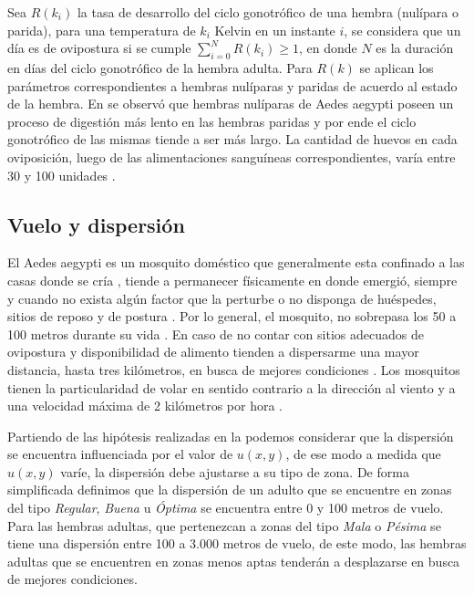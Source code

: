 Sea $R(k_{i})$ la tasa de desarrollo del ciclo gonotrófico de una hembra (nulípara o parida), para
una temperatura de $k_{i}$ Kelvin en un instante $i$, se considera que un día es de ovipostura si
se cumple $\sum_{i=0}^{N} R(k_{i}) \geq 1$, en donde $N$ es la duración en días del ciclo
gonotrófico de la hembra adulta. Para $R(k)$ se aplican los parámetros correspondientes a hembras
nulíparas y paridas de acuerdo al estado de la hembra. En \cite{edman1987host} se observó que
hembras nulíparas de Aedes aegypti poseen un proceso de digestión más lento en las hembras paridas
y por ende el ciclo gonotrófico de las mismas tiende a ser más largo. La cantidad de huevos en
cada oviposición, luego de las alimentaciones sanguíneas correspondientes, varía entre 30 y 100
unidades \cite{luevano1993ciclo, beltran2001bionomia,cabezas2005dengue}.

\subsection{Vuelo y dispersión}
El Aedes aegypti es un mosquito doméstico que generalmente esta confinado a las casas donde se
cría \cite{luevano1993ciclo}, tiende a permanecer físicamente en donde emergió, siempre y cuando
no exista algún factor que la perturbe o no disponga de huéspedes, sitios de reposo y de postura
\cite{ThironIzcazaJ2003}. Por lo general, el mosquito, no sobrepasa los 50 a 100 metros durante su
vida \cite{cabezas2005dengue}. En caso de no contar con sitios adecuados de ovipostura y
disponibilidad de alimento tienden a dispersarme una mayor distancia, hasta tres kilómetros, en
busca de mejores condiciones \cite{ThironIzcazaJ2003}. Los mosquitos tienen la particularidad de
volar en sentido contrario a la dirección al viento \cite{ThironIzcazaJ2003,web-site:speedAnimals}
y a una velocidad máxima de 2 kilómetros por hora \cite{web-site:speedAnimals,kaufmann2004flight}.

Partiendo de las hipótesis realizadas en la podemos considerar que la dispersión se encuentra
influenciada por el valor de $u(x,y)$, de ese modo a medida que $u(x,y)$ varíe, la dispersión debe
ajustarse a su tipo de zona. De forma simplificada definimos que la dispersión de un adulto que se
encuentre en zonas del tipo \textit{Regular}, \textit{Buena} u \textit{Óptima} se encuentra entre
0 y 100 metros de vuelo. Para las hembras adultas, que pertenezcan a zonas del tipo \textit{Mala}
o \textit{Pésima} se tiene una dispersión entre 100 a 3.000 metros de vuelo, de este modo, las
hembras adultas que se encuentren en zonas menos aptas tenderán a desplazarse en busca de mejores
condiciones.

